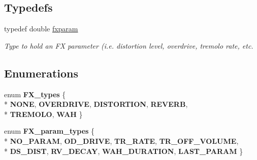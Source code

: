 \subsection*{Typedefs}
\begin{DoxyCompactItemize}
\item 
\hypertarget{group__fx_ga206aa2d2b25bdca17a838a03412b11f7}{typedef double \hyperlink{group__fx_ga206aa2d2b25bdca17a838a03412b11f7}{fxparam}}\label{group__fx_ga206aa2d2b25bdca17a838a03412b11f7}

\begin{DoxyCompactList}\small\item\em Type to hold an F\+X parameter (i.\+e. distortion level, overdrive, tremolo rate, etc. \end{DoxyCompactList}\end{DoxyCompactItemize}
\subsection*{Enumerations}
\begin{DoxyCompactItemize}
\item 
\hypertarget{group__fx_ga6ee5a38b8497791c4b173dcea4116086}{enum {\bfseries F\+X\+\_\+types} \{ \\*
{\bfseries N\+O\+N\+E}, 
{\bfseries O\+V\+E\+R\+D\+R\+I\+V\+E}, 
{\bfseries D\+I\+S\+T\+O\+R\+T\+I\+O\+N}, 
{\bfseries R\+E\+V\+E\+R\+B}, 
\\*
{\bfseries T\+R\+E\+M\+O\+L\+O}, 
{\bfseries W\+A\+H}
 \}}\label{group__fx_ga6ee5a38b8497791c4b173dcea4116086}

\item 
\hypertarget{group__fx_ga7071d6115e95b5800a26c1ef3c03ffae}{enum {\bfseries F\+X\+\_\+param\+\_\+types} \{ \\*
{\bfseries N\+O\+\_\+\+P\+A\+R\+A\+M}, 
{\bfseries O\+D\+\_\+\+D\+R\+I\+V\+E}, 
{\bfseries T\+R\+\_\+\+R\+A\+T\+E}, 
{\bfseries T\+R\+\_\+\+O\+F\+F\+\_\+\+V\+O\+L\+U\+M\+E}, 
\\*
{\bfseries D\+S\+\_\+\+D\+I\+S\+T}, 
{\bfseries R\+V\+\_\+\+D\+E\+C\+A\+Y}, 
{\bfseries W\+A\+H\+\_\+\+D\+U\+R\+A\+T\+I\+O\+N}, 
{\bfseries L\+A\+S\+T\+\_\+\+P\+A\+R\+A\+M}
 \}}\label{group__fx_ga7071d6115e95b5800a26c1ef3c03ffae}

\end{DoxyCompactItemize}
